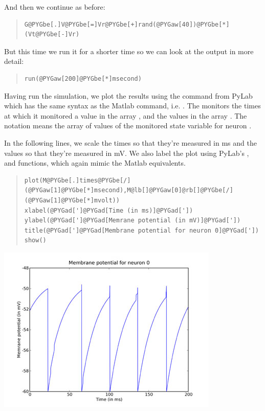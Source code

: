 \documentclass[letterpaper,10pt]{manual}
\begin{document}
And then we continue as before:
\begin{quote}

\begin{Verbatim}[commandchars=@\[\]]
G@PYGbe[.]V@PYGbe[=]Vr@PYGbe[+]rand(@PYGaw[40])@PYGbe[*](Vt@PYGbe[-]Vr)
\end{Verbatim}
\end{quote}

But this time we run it for a shorter time so we can look at
the output in more detail:
\begin{quote}

\begin{Verbatim}[commandchars=@\[\]]
run(@PYGaw[200]@PYGbe[*]msecond)
\end{Verbatim}
\end{quote}

Having run the simulation, we plot the results using the
 command from PyLab which has the same syntax as the Matlab
 command, i.e. . The \hyperlink{brian.StateMonitor}{}
monitors the times at which it monitored a value in the
array , and the values in the array . The notation
 means the array of values of the monitored state
variable for neuron .

In the following lines, we scale the times so that they're
measured in ms and the values so that they're measured in
mV. We also label the plot using PyLab's ,  and
 functions, which again mimic the Matlab equivalents.
\begin{quote}

\begin{Verbatim}[commandchars=@\[\]]
plot(M@PYGbe[.]times@PYGbe[/](@PYGaw[1]@PYGbe[*]msecond),M@lb[]@PYGaw[0]@rb[]@PYGbe[/](@PYGaw[1]@PYGbe[*]mvolt))
xlabel(@PYGad[']@PYGad[Time (in ms)]@PYGad['])
ylabel(@PYGad[']@PYGad[Memrane potential (in mV)]@PYGad['])
title(@PYGad[']@PYGad[Membrane potential for neuron 0]@PYGad['])
show()
\end{Verbatim}
\end{quote}

\includegraphics{1g.jpg}
\end{document}
